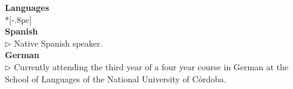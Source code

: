 \documentclass[letter,11pt,english]{article}
\begin{document}

{\large \bf Languages} \\*[-.8pc]
\underline{\hspace{6in}} \\
{\bf Spanish}\\
$\triangleright$ Native Spanish speaker.
\\
{\bf German}\\
$\triangleright$ Currently attending the third year of a four year course in German 
at the School of Languages of the National University of C\'ordoba.
 \\
\end{document}
